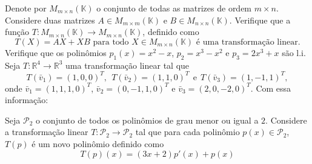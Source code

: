 \documentclass[11pt]{exam}
\begin{document}
\begin{questions}
  \question {\bf [10]} Denote por $M_{ m \times n}(\mathbb{K})$ o conjunto de todas as matrizes de ordem 
  $m \times n$. Considere duas matrizes $A \in M_{m \times m}(\mathbb{K})$ e $B \in M_{n \times n}(\mathbb{K})$.
  Verifique que a função $T:M_{ m \times n}(\mathbb{K}) \rightarrow M_{ m \times n}(\mathbb{K})$, 
  definido como  $$T(X)=AX+XB \text{ para todo }  X \in M_{m\times n}(\mathbb{K}) \text{ é uma transformação linear}.$$
  \question {\bf [10]} Verifique que os polinômios $p_1(x)=x^{2}-x$, $p_{2}=x^{3}-x^2$ e $p_{3}=2x^{3}+x$
  são l.i.
  \question
  Seja $T:\mathbb{R}^{4}\rightarrow \mathbb{R}^{3}$
  uma transformação linear tal que
  $$T(\bar{v}_1)=(1, 0, 0)^{T}, \ \ T(\bar{v}_2)=(1, 1, 0)^{T} \ \ \text{e}\ \ T(\bar{v}_3)=(1, -1, 1)^{T}, $$ 
  onde $\bar{v}_{1}=(1, 1, 1, 0)^{T}$, $\bar{v}_{2}=(0, -1, 1, 0)^{T}$ e $\bar{v}_3=(2, 0, -2, 0)^{T}$.
  Com essa informação:
 
 \question
  Seja $\mathcal{P}_2$ o conjunto de todos os polinômios de grau menor ou igual a $2$. 
  Considere a transformação linear $T:\mathcal{P}_{2}\rightarrow \mathcal{P}_2$
  tal que para cada polinômio $p(x) \in \mathcal{P}_2$, 
  $T(p)$ é um novo polinômio definido como 
  $$T(p)(x)=(3x+2)p'(x)+p(x)$$ %
 
  \end{questions}
   
\end{document}
